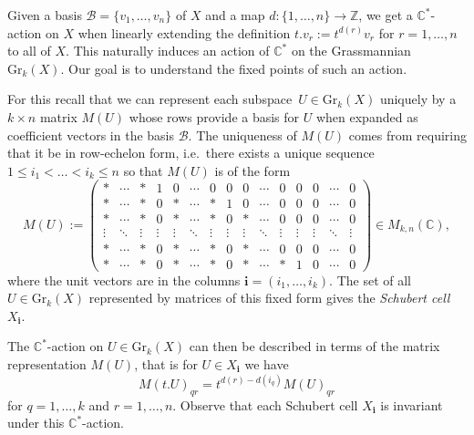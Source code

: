 \documentclass{amsart}
\numberwithin{equation}{section}
\newcommand{\C}{\mathbb{C}}
\newcommand{\CC}{\mathbb{C}}
\newcommand{\ZZ}{\mathbb{Z}}
\newcommand{\bfi}{\mathbf{i}}
\newcommand{\Gr}{\mathrm{Gr}}
\begin{document}
Given a basis $\mathcal B=\{v_1,\ldots,v_n\}$ of $X$ and a map $d:\{1,\ldots,n\}\to\ZZ$, we get a $\C^\ast$-action on $X$ when linearly extending the definition $t.v_r:=t^{d(r)}v_r$ for $r=1,\ldots,n$ to all of $X$.
This naturally induces an action of $\C^\ast$ on the Grassmannian $\Gr_k(X)$.
Our goal is to understand the fixed points of such an action.

For this recall that we can represent each subspace~$U\in\Gr_k(X)$ uniquely by a $k\times n$ matrix $M(U)$ whose rows provide a basis for $U$ when expanded as coefficient vectors in the basis $\mathcal B$.
The uniqueness of $M(U)$ comes from requiring that it be in row-echelon form, i.e.\ there exists a unique sequence $1\leq i_1<\ldots<i_k\leq n$ so that $M(U)$ is of the form
\[M(U):=
  \begin{pmatrix}
    \ast&\cdots &\ast &1&0 &\cdots& 0 & 0 & 0 &\cdots&0&0&0&\cdots&0\\
    \ast&\cdots &\ast&0&\ast&\cdots &\ast&1&0&\cdots&0&0&0&\cdots&0\\
    \ast &\cdots&\ast&0&\ast &\cdots&\ast&0&\ast&\cdots&0&0&0&\cdots&0\\[-0.4em]
    \vdots &\ddots&\vdots&\vdots&\vdots &\ddots&\vdots&\vdots&\vdots&\ddots&\vdots&\vdots&\vdots&\ddots&\vdots\\
    \ast&\cdots &\ast&0&\ast&\cdots &\ast&0&\ast&\cdots&0&0&0&\cdots&0\\
    \ast&\cdots &\ast&0&\ast&\cdots &\ast&0&\ast&\cdots&\ast&1&0&\cdots&0
  \end{pmatrix}\in M_{k,n}(\CC),\]
where the unit vectors are in the columns $\bfi=(i_1,\ldots,i_k)$.
The set of all $U\in\Gr_k(X)$ represented by matrices of this fixed form gives the \emph{Schubert cell} $X_\bfi$.

The $\C^\ast$-action on $U\in\Gr_k(X)$ can then be described in terms of the matrix representation $M(U)$, that is for $U\in X_\bfi$ we have
\[M(t.U)_{qr}=t^{d(r)-d(i_q)} M(U)_{qr}\]
for $q=1,\ldots,k$ and $r=1,\ldots,n$.
Observe that each Schubert cell $X_\bfi$ is invariant under this $\CC^*$-action.
\end{document}
